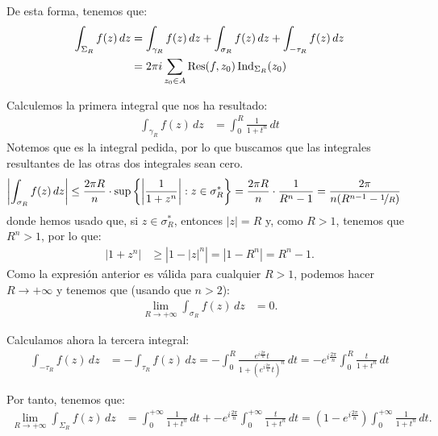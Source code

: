\begin{ejercicio}
    De esta forma, tenemos que:
    \begin{align*}
        \int_{\Sigma_R} f(z) \, dz &= \int_{\gamma_R} f(z) \, dz + \int_{\sigma_R} f(z) \, dz + \int_{-\tau_R} f(z) \, dz \\
        &= 2\pi i\sum_{z_0\in A}\operatorname{Res}(f,z_0)\operatorname{Ind}_{\Sigma_R}(z_0)
    \end{align*}

    Calculemos la primera integral que nos ha resultado:
    \begin{align*}
        \int_{\gamma_R} f(z) \, dz &= \int_{0}^{R} \frac{1}{1 + t^n} \, dt
    \end{align*}
    Notemos que es la integral pedida, por lo que buscamos que las integrales resultantes de las otras dos integrales sean cero.
    \begin{align*}
        \left| \int_{\sigma_R} f(z) \, dz \right|
        &\leq \frac{2\pi R}{n}\cdot \sup\left\{\left|\dfrac{1}{1 + z^n}\right| : z\in \sigma_R^*\right\}
        = \frac{2\pi R}{n}\cdot \frac{1}{R^n - 1}
        = \frac{2\pi}{n(R^{n-1} - \nicefrac{1}{R})}
    \end{align*}
    donde hemos usado que, si $z\in \sigma_R^*$, entonces $|z|=R$ y, como $R>1$, tenemos que $R^n>1$, por lo que:
    \begin{align*}
        |1 + z^n| &\geq \left|1- |z|^n\right| = \left|1 - R^n\right| = R^n - 1.
    \end{align*}
    Como la expresión anterior es válida para cualquier $R > 1$, podemos hacer $R \to +\infty$ y tenemos que (usando que $n > 2$):
    \begin{align*}
        \lim_{R\to+\infty} \int_{\sigma_R} f(z) \, dz &= 0.
    \end{align*}

    Calculamos ahora la tercera integral:
    \begin{align*}
        \int_{-\tau_R} f(z) \, dz &= -\int_{\tau_R} f(z) \, dz
        = -\int_{0}^{R} \frac{e^{i\frac{2\pi}{n}}t}{1 + (e^{i\frac{2\pi}{n}}t)^n} \, dt
        = -e^{i\frac{2\pi}{n}}\int_{0}^{R} \frac{t}{1 + t^n} \, dt
    \end{align*}

    Por tanto, tenemos que:
    \begin{align*}
        \lim_{R\to+\infty} \int_{\Sigma_R} f(z) \, dz &= \int_{0}^{+\infty} \frac{1}{1 + t^n} \, dt + - e^{i\frac{2\pi}{n}}\int_{0}^{+\infty} \frac{t}{1 + t^n} \, dt
        = \left(1 - e^{i\frac{2\pi}{n}}\right)\int_{0}^{+\infty} \frac{1}{1 + t^n} \, dt.
    \end{align*}


\end{ejercicio}
